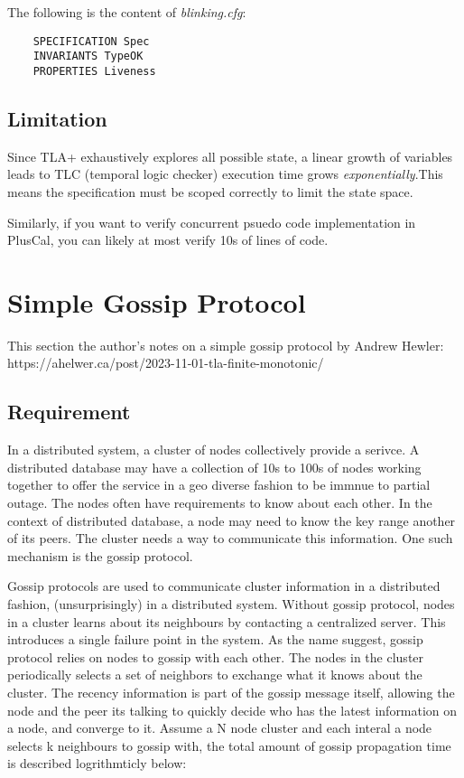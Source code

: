\documentclass{report}
\begin{document}
The following is the content of \textit{blinking.cfg}:

\begin{lstlisting}
    SPECIFICATION Spec
    INVARIANTS TypeOK
    PROPERTIES Liveness
\end{lstlisting}

\section{Limitation}

Since TLA+ exhaustively explores all possible state, a linear growth of
variables leads to TLC (temporal logic checker) execution time grows
\textit{exponentially}.This means the specification must be scoped correctly to
limit the state space.\newline

Similarly, if you want to verify concurrent psuedo code implementation in
PlusCal, you can likely at most verify 10s of lines of code.

\chapter{Simple Gossip Protocol}

This section the author's notes on a simple gossip protocol by Andrew Hewler:\newline
https://ahelwer.ca/post/2023-11-01-tla-finite-monotonic/\newline

\section{Requirement}

In a distributed system, a cluster of nodes collectively provide a serivce. A
distributed database may have a collection of 10s to 100s of nodes working
together to offer the service in a geo diverse fashion to be immnue to partial
outage.  The nodes often have requirements to know about each other. In the
context of distributed database, a node may need to know the key range another
of its peers. The cluster needs a way to communicate this information. One such
mechanism is the gossip protocol.\newline

Gossip protocols are used to communicate cluster information in a distributed
fashion, (unsurprisingly) in a distributed system. Without gossip protocol, 
nodes in a cluster learns about its neighbours by contacting a centralized
server. This introduces a single failure point in the system. As the name
suggest, gossip protocol relies on nodes to gossip with each other. The nodes in
the cluster periodically selects a set of neighbors to exchange what it knows
about the cluster. The recency information is part of the gossip message
itself, allowing the node and the peer its talking to quickly decide who has the
latest information on a node, and converge to it. Assume a N node cluster and
each interal a node selects k neighbours to gossip with, the total amount of
gossip propagation time is described logrithmticly below:
\end{document}
